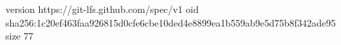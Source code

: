 version https://git-lfs.github.com/spec/v1
oid sha256:1c20ef463faa926815d0cfe6cbe10ded4e8899ea1b559ab9e5d75b8f342ade95
size 77
